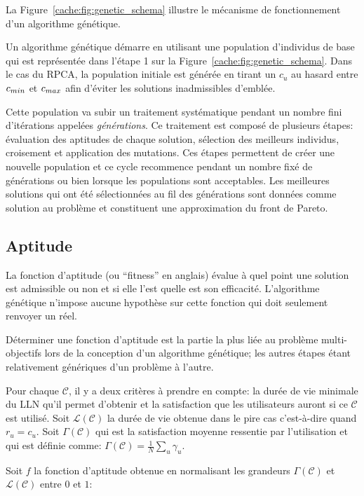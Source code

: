 La Figure~\ref{cache:fig:genetic_schema} illustre le mécanisme de fonctionnement d'un algorithme génétique.

Un algorithme génétique démarre en utilisant une population d'individus de base qui est représentée dans l'étape 1 sur la Figure~\ref{cache:fig:genetic_schema}.
Dans le cas du \ac{RPCA}, la population initiale est générée en tirant un $c_u$ au hasard entre $c_{min}$ et $c_{max}$ afin d'éviter les solutions inadmissibles d'emblée.

Cette population va subir un traitement systématique pendant un nombre fini d'itérations appelées \emph{générations}.
Ce traitement est composé de plusieurs étapes: évaluation des aptitudes de chaque solution, sélection des meilleurs individus, croisement et application des mutations.
Ces étapes permettent de créer une nouvelle population et ce cycle recommence pendant un nombre fixé de générations ou bien lorsque les populations sont acceptables.
Les meilleures solutions qui ont été sélectionnées au fil des générations sont données comme solution au problème et constituent une approximation du front de Pareto.

\subsection{Aptitude}
\label{cache:fitness}

La fonction d'aptitude (ou ``fitness'' en anglais) évalue à quel point une solution est admissible ou non et si elle l'est quelle est son efficacité.
L'algorithme génétique n'impose aucune hypothèse sur cette fonction qui doit seulement renvoyer un réel.

Déterminer une fonction d'aptitude est la partie la plus liée au problème multi-objectifs lors de la conception d'un algorithme génétique; les autres étapes étant relativement génériques d'un problème à l'autre.

Pour chaque $\mathcal{C}$, il y a deux critères à prendre en compte: la durée de vie minimale du \ac{LLN} qu'il permet d'obtenir et la satisfaction que les utilisateurs auront si ce $\mathcal{C}$ est utilisé.
Soit $\mathcal{L}(\mathcal{C})$ la durée de vie obtenue dans le pire cas c'est-à-dire quand $r_u = c_u$.
Soit $\Gamma(\mathcal{C})$ qui est la satisfaction moyenne ressentie par l'utilisation et qui est définie comme: $\Gamma(\mathcal{C}) = \frac{1}{N}\sum_{u} \gamma_u$.

Soit $f$ la fonction d'aptitude obtenue en normalisant les grandeurs $\Gamma(\mathcal{C})$ et $\mathcal{L(C)}$ entre $0$ et $1$:

